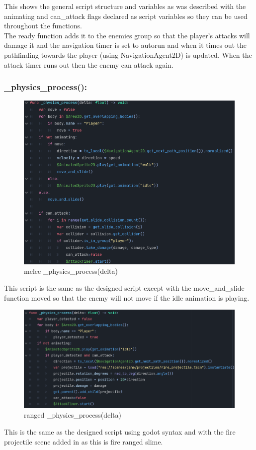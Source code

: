 \documentclass{article}
\begin{document}
        This shows the general script structure and variables as was described with the animating and can\_attack flags declared as script variables so they can be used throughout the functions.\\
        The ready function adds it to the enemies group so that the player's attacks will damage it and the navigation timer is set to autorun and when it times out the pathfinding towards the player (using NavigationAgent2D) is updated. When the attack timer runs out then the enemy can attack again.\\
        \subsubsection{\_physics\_process():}
        \begin{figure}[H]
                \centering
                \includegraphics[width = 0.8\columnwidth]{images/development/Enemy_physics_process_melee.PNG}
                \caption{melee \_physics\_process(delta)}
        \end{figure}
        This script is the same as the designed script except with the move\_and\_slide function moved so that the enemy will not move if the idle animation is playing.\\
        \begin{figure}[H]
                \centering
                \includegraphics[width = 0.8\columnwidth]{images/development/Enemy_physics_process_ranged.PNG}
                \caption{ranged \_physics\_process(delta)}
        \end{figure}
        This is the same as the designed script using godot syntax and with the fire projectile scene added in as this is fire ranged slime.\\
\end{document}
